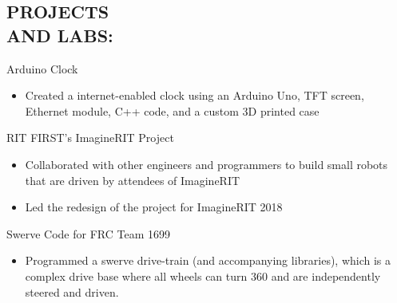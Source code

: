 \documentclass[line,margin]{res}
\begin{document}
\begin{resume}
\section{PROJECTS \\AND LABS:}


	Arduino Clock
	\begin{itemize}
		\item Created a internet-enabled clock using an Arduino Uno, TFT screen, Ethernet module, C++ code, and a custom 3D printed case
	\end{itemize}
	\vspace{-10pt}

	RIT FIRST's ImagineRIT Project
	\begin{itemize}
		\item Collaborated with other engineers and programmers to build small robots that are driven by attendees of ImagineRIT 
		\item Led the redesign of the project for ImagineRIT 2018
	\end{itemize}
	\vspace{-10pt}

	Swerve Code for FRC Team 1699
	\begin{itemize} 
		\item Programmed a swerve drive-train (and accompanying libraries), which is a complex drive base where all wheels can turn 360\textdegree \hspace{.5pt} and are independently steered and driven.
	\end{itemize}
	\vspace{-10pt}


\end{resume}
\end{document}
